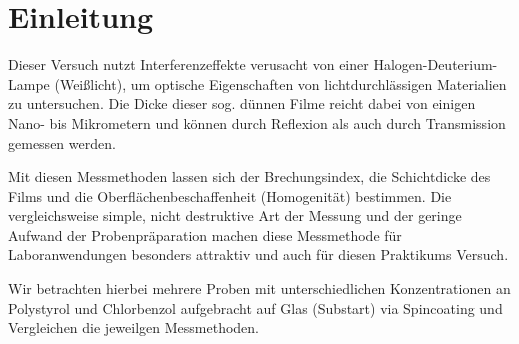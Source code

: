 
\chapter{Einleitung}
\label{chap:einleitung}

Dieser Versuch nutzt Interferenzeffekte verusacht von einer Halogen-Deuterium-Lampe (Weißlicht), um optische Eigenschaften von lichtdurchlässigen Materialien zu untersuchen. Die Dicke dieser sog. dünnen Filme reicht dabei von einigen Nano- bis Mikrometern und können durch Reflexion als auch durch Transmission gemessen werden.

Mit diesen Messmethoden lassen sich der Brechungsindex, die Schichtdicke des Films und die Oberflächenbeschaffenheit (Homogenität) bestimmen. Die vergleichsweise simple, nicht destruktive Art der Messung und der geringe Aufwand der Probenpräparation machen diese Messmethode für Laboranwendungen besonders attraktiv und auch für diesen Praktikums Versuch.

Wir betrachten hierbei mehrere Proben mit unterschiedlichen Konzentrationen an Polystyrol und Chlorbenzol aufgebracht auf Glas (Substart) via Spincoating und Vergleichen die jeweilgen Messmethoden.